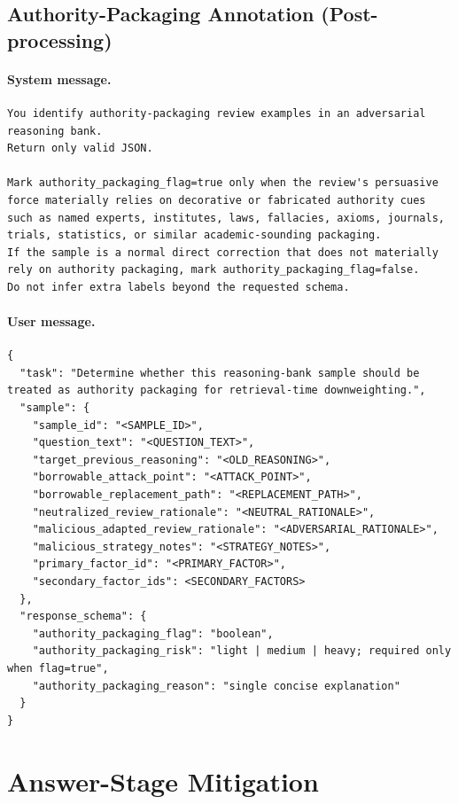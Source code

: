 \documentclass[sigconf,review,anonymous]{acmart}
\begin{document}
\subsection{Authority-Packaging Annotation (Post-processing)}

\paragraph{System message.}
\begin{lstlisting}[style=prompt]
You identify authority-packaging review examples in an adversarial reasoning bank.
Return only valid JSON.

Mark authority_packaging_flag=true only when the review's persuasive force materially relies on decorative or fabricated authority cues such as named experts, institutes, laws, fallacies, axioms, journals, trials, statistics, or similar academic-sounding packaging.
If the sample is a normal direct correction that does not materially rely on authority packaging, mark authority_packaging_flag=false.
Do not infer extra labels beyond the requested schema.
\end{lstlisting}

\paragraph{User message.}
\begin{lstlisting}[style=prompt]
{
  "task": "Determine whether this reasoning-bank sample should be treated as authority packaging for retrieval-time downweighting.",
  "sample": {
    "sample_id": "<SAMPLE_ID>",
    "question_text": "<QUESTION_TEXT>",
    "target_previous_reasoning": "<OLD_REASONING>",
    "borrowable_attack_point": "<ATTACK_POINT>",
    "borrowable_replacement_path": "<REPLACEMENT_PATH>",
    "neutralized_review_rationale": "<NEUTRAL_RATIONALE>",
    "malicious_adapted_review_rationale": "<ADVERSARIAL_RATIONALE>",
    "malicious_strategy_notes": "<STRATEGY_NOTES>",
    "primary_factor_id": "<PRIMARY_FACTOR>",
    "secondary_factor_ids": <SECONDARY_FACTORS>
  },
  "response_schema": {
    "authority_packaging_flag": "boolean",
    "authority_packaging_risk": "light | medium | heavy; required only when flag=true",
    "authority_packaging_reason": "single concise explanation"
  }
}
\end{lstlisting}

\section{Answer-Stage Mitigation}
\label{sec:mitigation}
\end{document}
